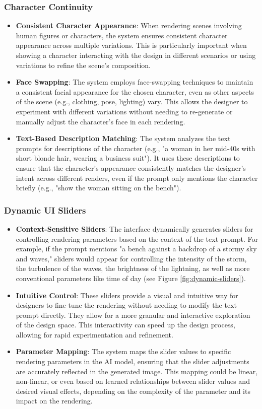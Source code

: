 \subsubsection{Character Continuity}
\begin{itemize}
\item \textbf{Consistent Character Appearance}: When rendering scenes involving human figures or characters, the system ensures consistent character appearance across multiple variations. This is particularly important when showing a character interacting with the design in different scenarios or using variations to refine the scene's composition.
\item \textbf{Face Swapping}: The system employs face-swapping techniques to maintain a consistent facial appearance for the chosen character, even as other aspects of the scene (e.g., clothing, pose, lighting) vary. This allows the designer to experiment with different variations without needing to re-generate or manually adjust the character's face in each rendering.
\item \textbf{Text-Based Description Matching}: The system analyzes the text prompts for descriptions of the character (e.g., "a woman in her mid-40s with short blonde hair, wearing a business suit"). It uses these descriptions to ensure that the character's appearance consistently matches the designer's intent across different renders, even if the prompt only mentions the character briefly (e.g., "show the woman sitting on the bench").
\end{itemize}

\subsubsection{Dynamic UI Sliders}
\begin{itemize}
\item \textbf{Context-Sensitive Sliders}: The interface dynamically generates sliders for controlling rendering parameters based on the context of the text prompt. For example, if the prompt mentions "a bench against a backdrop of a stormy sky and waves," sliders would appear for controlling the intensity of the storm, the turbulence of the waves, the brightness of the lightning, as well as more conventional parameters like time of day (see Figure \ref{fig:dynamic-sliders}).
\item \textbf{Intuitive Control}: These sliders provide a visual and intuitive way for designers to fine-tune the rendering without needing to modify the text prompt directly. They allow for a more granular and interactive exploration of the design space. This interactivity can speed up the design process, allowing for rapid experimentation and refinement.
\item \textbf{Parameter Mapping}: The system maps the slider values to specific rendering parameters in the AI model, ensuring that the slider adjustments are accurately reflected in the generated image. This mapping could be linear, non-linear, or even based on learned relationships between slider values and desired visual effects, depending on the complexity of the parameter and its impact on the rendering.
\end{itemize}

